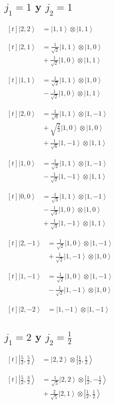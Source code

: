 \documentclass[11pt,a4paper]{article}
\newcommand{\estadocelda}[1]{%
  \begin{minipage}[t]{0.48\linewidth}
  \small\raggedright
  \(\displaystyle\begin{aligned}[t]#1\end{aligned}\)
  \end{minipage}%
}
\newcommand{\ket}[1]{\left|#1\right\rangle}
\begin{document}
\subsection{\texorpdfstring{$j_1=1$ y $j_2=1$}{j1=1 y j2=1}}

\noindent\estadocelda{
\ket{2,2} &= \ket{1,1}\otimes\ket{1,1}
}\hfill\estadocelda{
\ket{2,1} &= \frac{1}{\sqrt{2}}\ket{1,1}\otimes\ket{1,0} \\
 &{}+\frac{1}{\sqrt{2}}\ket{1,0}\otimes\ket{1,1}
}\par\addvspace{1.4em}

\noindent\estadocelda{
\ket{1,1} &= \frac{1}{\sqrt{2}}\ket{1,1}\otimes\ket{1,0} \\
 &{}-\frac{1}{\sqrt{2}}\ket{1,0}\otimes\ket{1,1}
}\hfill\estadocelda{
\ket{2,0} &= \frac{1}{\sqrt{6}}\ket{1,1}\otimes\ket{1,-1} \\
 &{}+\sqrt{\frac{2}{3}}\ket{1,0}\otimes\ket{1,0} \\
 &{}+\frac{1}{\sqrt{6}}\ket{1,-1}\otimes\ket{1,1}
}\par\addvspace{1.4em}

\noindent\estadocelda{
\ket{1,0} &= \frac{1}{\sqrt{2}}\ket{1,1}\otimes\ket{1,-1} \\
 &{}-\frac{1}{\sqrt{2}}\ket{1,-1}\otimes\ket{1,1}
}\hfill\estadocelda{
\ket{0,0} &= \frac{1}{\sqrt{3}}\ket{1,1}\otimes\ket{1,-1} \\
 &{}-\frac{1}{\sqrt{3}}\ket{1,0}\otimes\ket{1,0} \\
 &{}+\frac{1}{\sqrt{3}}\ket{1,-1}\otimes\ket{1,1}
}\par\addvspace{1.4em}

\noindent\estadocelda{
\ket{2,-1} &= \frac{1}{\sqrt{2}}\ket{1,0}\otimes\ket{1,-1} \\
 &{}+\frac{1}{\sqrt{2}}\ket{1,-1}\otimes\ket{1,0}
}\hfill\estadocelda{
\ket{1,-1} &= \frac{1}{\sqrt{2}}\ket{1,0}\otimes\ket{1,-1} \\
 &{}-\frac{1}{\sqrt{2}}\ket{1,-1}\otimes\ket{1,0}
}\par\addvspace{1.4em}

\noindent\estadocelda{
\ket{2,-2} &= \ket{1,-1}\otimes\ket{1,-1}
}\par\addvspace{1.4em}

\subsection{\texorpdfstring{$j_1=2$ y $j_2=\frac{1}{2}$}{j1=2 y j2=1/2}}

\noindent\estadocelda{
\ket{\frac{5}{2},\frac{5}{2}} &= \ket{2,2}\otimes\ket{\frac{1}{2},\frac{1}{2}}
}\hfill\estadocelda{
\ket{\frac{5}{2},\frac{3}{2}} &= \frac{1}{\sqrt{5}}\ket{2,2}\otimes\ket{\frac{1}{2},-\frac{1}{2}} \\
 &{}+\frac{2}{\sqrt{5}}\ket{2,1}\otimes\ket{\frac{1}{2},\frac{1}{2}}
}\par\addvspace{1.4em}
\end{document}
